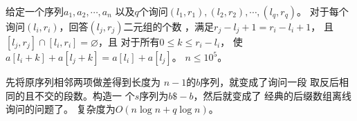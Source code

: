 \begin{prob}
	给定一个序列$a_1,a_2,\cdots,a_n$
	以及$q$个询问$(l_1,r_1),(l_2,r_2),\cdots,(l_q,r_q)$。
	对于每个询问$(l_i,r_i)$，回答$(l_j,r_j)$二元组的个数
	，满足$r_j-l_j+1=r_i-l_i+1$，
	且$[l_j,r_j] \cap [l_i,r_i] = \varnothing$，且
	对于所有$0 \le k \le r_i-l_i$，
	使$a[l_i+k]+a[l_j+k]=a[l_i]+a[l_j]$。
	$n \le 10^5$。
\end{prob}

\begin{sol}
	先将原序列相邻两项做差得到长度为
	$n-1$的$b$序列，就变成了询问一段
	取反后相同的且不交的段数。构造一
	个$s$序列为$b\$-b$，然后就变成了
	经典的后缀数组离线询问的问题了。
	复杂度为$O(n \log n+q\log n)$。
\end{sol}
